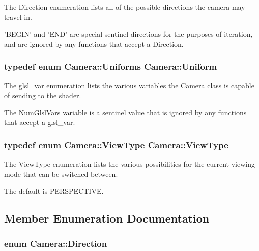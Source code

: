 The Direction enumeration lists all of the possible directions the camera may travel in. 

'B\-E\-G\-I\-N' and 'E\-N\-D' are special sentinel directions for the purposes of iteration, and are ignored by any functions that accept a Direction. \hypertarget{class_camera_a0ed19c96505cbb70625938d1e883af24}{
\subsubsection[{Uniform}]{\setlength{\rightskip}{0pt plus 5cm}typedef enum {\bf Camera\-::\-Uniforms}  {\bf Camera\-::\-Uniform}}}\label{class_camera_a0ed19c96505cbb70625938d1e883af24}


The glsl\-\_\-var enumeration lists the various variables the \hyperlink{class_camera}{Camera} class is capable of sending to the shader. 

The Num\-Glsl\-Vars variable is a sentinel value that is ignored by any functions that accept a glsl\-\_\-var. \hypertarget{class_camera_a5b2dc5eaed6cbaabee0eea3f2714acd7}{
\subsubsection[{View\-Type}]{\setlength{\rightskip}{0pt plus 5cm}typedef enum {\bf Camera\-::\-View\-Type}  {\bf Camera\-::\-View\-Type}}}\label{class_camera_a5b2dc5eaed6cbaabee0eea3f2714acd7}


The View\-Type enumeration lists the various possibilities for the current viewing mode that can be switched between. 

The default is P\-E\-R\-S\-P\-E\-C\-T\-I\-V\-E. 

\subsection{Member Enumeration Documentation}
\hypertarget{class_camera_a80cb65605322d27ad3b6d973484509ec}{
\subsubsection[{Direction}]{\setlength{\rightskip}{0pt plus 5cm}enum {\bf Camera\-::\-Direction}}}\label{class_camera_a80cb65605322d27ad3b6d973484509ec}



